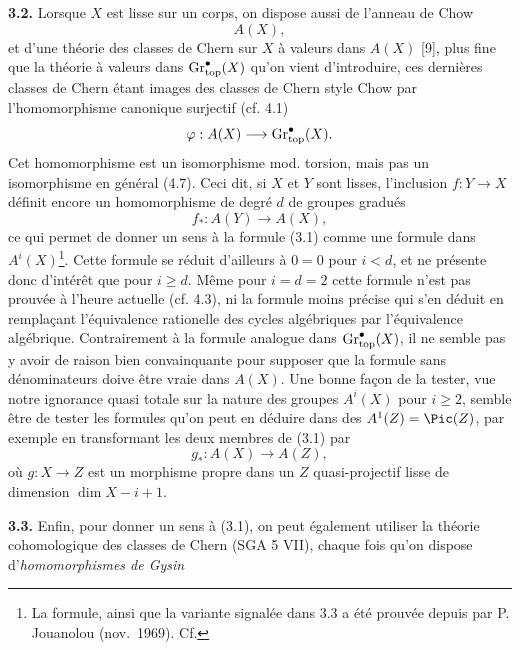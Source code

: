 \textbf{3.2.} Lorsque $X$ est lisse sur un corps, on dispose aussi de l'anneau de Chow
\[
 A(X),
\]
et d'une théorie des classes de Chern sur $X$ à valeurs dans $A(X)$ [9], plus fine que la théorie à valeurs dans $\operatorname{Gr}_{\mathrm{top}}^\bullet(X)$ qu'on vient d'introduire, ces dernières classes de Chern étant images des classes de Chern style Chow par l'homomorphisme canonique surjectif (cf. 4.1)
\[
 \varphi:A(X)\longrightarrow \operatorname{Gr}_{\mathrm{top}}^\bullet(X).
\]
Cet homomorphisme est un isomorphisme mod. torsion, mais pas un isomorphisme en général (4.7). Ceci dit, si $X$ et $Y$ sont lisses, l'inclusion $f:Y\to X$ définit encore un homomorphisme de degré $d$ de groupes gradués
\[
 f_*:A(Y)\longrightarrow A(X),
\]
ce qui permet de donner un sens à la formule (3.1) comme une formule dans $A^i(X)$\footnote{La formule, ainsi que la variante signalée dans 3.3 a été prouvée depuis par P. Jouanolou (nov.\ 1969). Cf.}. Cette formule se réduit d'ailleurs à $0=0$ pour $i<d$, et ne présente donc d'intérêt que pour $i\geq d$. Même pour $i=d=2$ cette formule n'est pas prouvée à l'heure actuelle (cf. 4.3), ni la formule moins précise qui s'en déduit en remplaçant l'équivalence rationelle des cycles algébriques par l'équivalence algébrique. Contrairement à la formule analogue dans $\operatorname{Gr}_{\mathrm{top}}^\bullet(X)$, il ne semble pas y avoir de raison bien convainquante pour supposer que la formule sans dénominateurs doive être vraie dans $A(X)$. Une bonne façon de la tester, vue notre ignorance quasi totale sur la nature des groupes $A^i(X)$ pour $i\geq 2$, semble être de tester les formules qu'on peut en déduire dans des $A^1(Z)=\Pic(Z)$, par exemple en transformant les deux membres de (3.1) par
\[
 g_*:A(X)\longrightarrow A(Z),
\]
où $g:X\to Z$ est un morphisme propre dans un $Z$ quasi-projectif lisse de dimension $\dim X-i+1$.

\textbf{3.3.} Enfin, pour donner un sens à (3.1), on peut également utiliser la théorie cohomologique des classes de Chern (SGA 5 VII), chaque fois qu'on dispose d'\emph{homomorphismes de Gysin}
